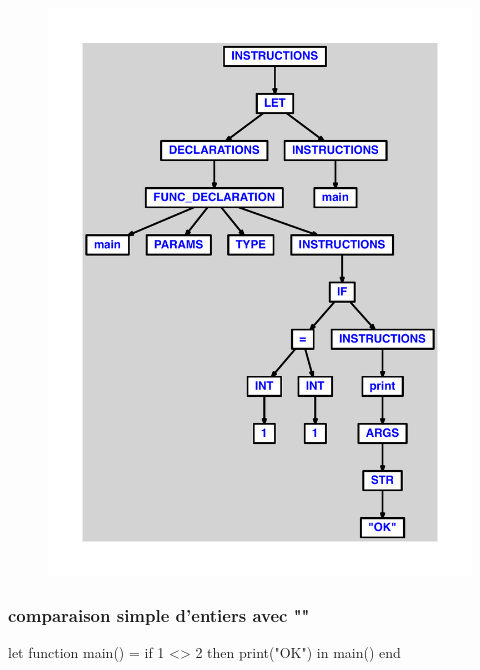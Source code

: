\documentclass{article}
\begin{document}
\begin{figure}[H]\centering\includegraphics[max width=\textwidth]{ast/ast_171.pdf}\end{figure}\subsubsection{comparaison simple d'entiers avec ""}
\begin{verbatimtab}
let
	function main() =
		if 1 <> 2 then print("OK")
in main() end
\end{verbatimtab}
\end{document}
